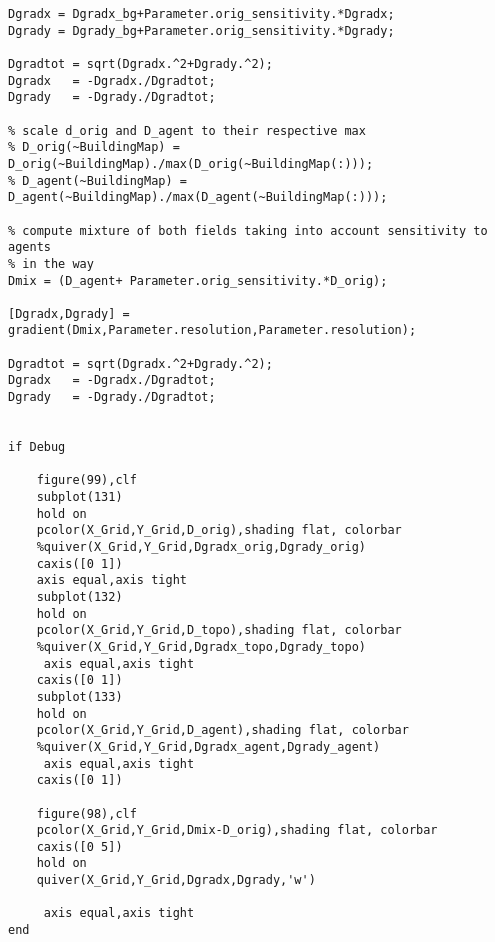 \begin{lstlisting}[breaklines]
Dgradx = Dgradx_bg+Parameter.orig_sensitivity.*Dgradx;
Dgrady = Dgrady_bg+Parameter.orig_sensitivity.*Dgrady;

Dgradtot = sqrt(Dgradx.^2+Dgrady.^2);
Dgradx   = -Dgradx./Dgradtot;
Dgrady   = -Dgrady./Dgradtot;

% scale d_orig and D_agent to their respective max
% D_orig(~BuildingMap) = D_orig(~BuildingMap)./max(D_orig(~BuildingMap(:)));
% D_agent(~BuildingMap) = D_agent(~BuildingMap)./max(D_agent(~BuildingMap(:)));

% compute mixture of both fields taking into account sensitivity to agents
% in the way
Dmix = (D_agent+ Parameter.orig_sensitivity.*D_orig);

[Dgradx,Dgrady] = gradient(Dmix,Parameter.resolution,Parameter.resolution);

Dgradtot = sqrt(Dgradx.^2+Dgrady.^2);
Dgradx   = -Dgradx./Dgradtot;
Dgrady   = -Dgrady./Dgradtot;


if Debug

    figure(99),clf
    subplot(131)
    hold on
    pcolor(X_Grid,Y_Grid,D_orig),shading flat, colorbar
    %quiver(X_Grid,Y_Grid,Dgradx_orig,Dgrady_orig)
    caxis([0 1])
    axis equal,axis tight
    subplot(132)
    hold on
    pcolor(X_Grid,Y_Grid,D_topo),shading flat, colorbar
    %quiver(X_Grid,Y_Grid,Dgradx_topo,Dgrady_topo)
     axis equal,axis tight
    caxis([0 1])
    subplot(133)
    hold on
    pcolor(X_Grid,Y_Grid,D_agent),shading flat, colorbar
    %quiver(X_Grid,Y_Grid,Dgradx_agent,Dgrady_agent)
     axis equal,axis tight
    caxis([0 1])

    figure(98),clf
    pcolor(X_Grid,Y_Grid,Dmix-D_orig),shading flat, colorbar
    caxis([0 5])
    hold on
    quiver(X_Grid,Y_Grid,Dgradx,Dgrady,'w')

     axis equal,axis tight
end
\end{lstlisting}